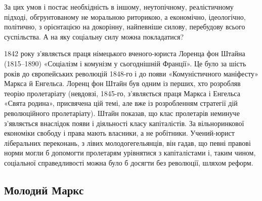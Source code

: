 За цих умов і постає необхідність в іншому, неутопічному, 
реалістичному підході, обгрунтованому не моральною риторикою, а 
економічно, ідеологічно, політично, з орієнтацією на докорінну, 
найпевніше силову, перебудову всього суспільства. А на яку соціальну 
силу можна покладатися?


1842 року з'являється праця німецького вченого-юриста Лоренца фон 
Штайна (1815--1890) «Соціалізм і комунізм у сьогоднішній Франції». Це було 
за шість років до європейських революцій 1848-го і до появи 
«Комуністичного маніфесту» Маркса й Енгельса. Лоренц фон Штайн був 
одним із перших, хто розробляв теорію пролетаріату (невдовзі, 1845-го, 
з'являється праця Маркса і Енгельса «Свята родина», присвячена цій 
темі, але вже із розробленням стратегії дій революційного 
пролетаріату). Штайн показав, що клас пролетарів неминуче з'являється 
внаслідок появи і діяльності класу капіталістів. За вільноринкової 
економіки свободу і права мають власники, а не робітники. Учений-юрист 
ліберальних переконань, з лівих молодогегельянців, він гадав, що певні 
правові норми могли б допомогти пролетарям урівнятися з 
капіталістами і, таким чином, соціальної справедливості можна було б 
досягти без революції, шляхом реформ.

\subsection*{Молодий Маркс}

